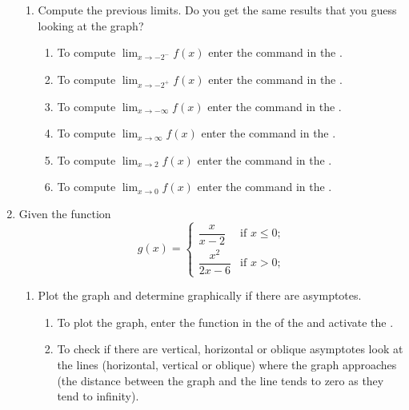 \begin{enumerate}[leftmargin=*]
\begin{enumerate}
      \item Compute the previous limits. Do you get the same results that you guess looking at the graph?
            \begin{indication}
            \begin{enumerate}
            \item To compute $\lim_{x\rightarrow -2^-} f(x)$ enter the command  in the .
            \item To compute $\lim_{x\rightarrow -2^+} f(x)$ enter the command  in the .
            \item To compute $\lim_{x\rightarrow -\infty} f(x)$ enter the command  in the .
            \item To compute $\lim_{x\rightarrow \infty} f(x)$ enter the command  in the .
            \item To compute $\lim_{x\rightarrow 2} f(x)$ enter the command  in the .
            \item To compute $\lim_{x\rightarrow 0} f(x)$ enter the command  in the .
            \end{enumerate}
            \end{indication}
      \end{enumerate}

\item Given the function
      \[
      g(x)=
      \begin{cases}
      \dfrac{x}{x-2}    & \mbox{if $x\leq 0$;} \\
      \dfrac{x^2}{2x-6} & \mbox{if $x>0$;}
      \end{cases}
      \]
      \begin{enumerate}
      \item Plot the graph and determine graphically if there are asymptotes.
            \begin{indication}
            \begin{enumerate}
            \item To plot the graph, enter the function  in the  of the  and activate the .
            \item To check if there are vertical, horizontal or oblique asymptotes look at the lines (horizontal, vertical or oblique) where the graph approaches (the distance between the graph and the line tends to zero as they tend to infinity).
            \end{enumerate}
            \end{indication}


\end{enumerate}
\end{enumerate}
